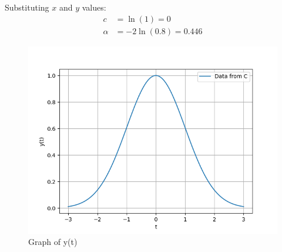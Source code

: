 \documentclass[journal,12pt,twocolumn]{IEEEtran}
\theoremstyle{remark}
\begin{document}
Substituting $x$ and $y$ values:
\begin{align}
    c &= \ln(1) = 0\\
    \alpha &= -2 \ln(0.8) = 0.446
\end{align}

\begin{figure}[!h] 
    \centering
    \includegraphics[width=\columnwidth]{figs/graph_of_y(t).png}
    \caption{Graph of y(t)}
    \label{fig:Graph1_gate_CE_30}
    \end{figure}
\end{document}
